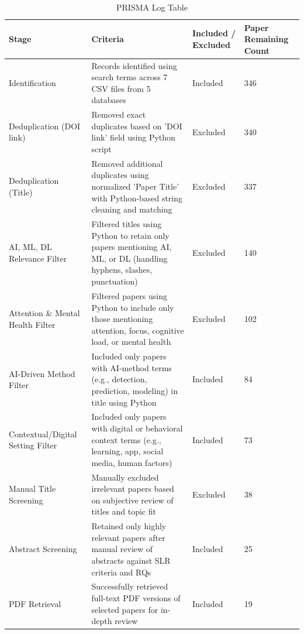 \documentclass[twocolumn,12pt]{article}
\begin{document}
\begin{table}[H]
\centering
\hspace{2cm}
\caption{PRISMA Log Table}
\begin{tabular}{|p{}|p{}|p{}|p{}|}
\hline
\textbf{Stage} & \textbf{Criteria} & \textbf{Included / Excluded} & \textbf{Paper Remaining Count} \\
\hline
Identification & Records identified using search terms across 7 CSV files from 5 databases & Included & 346 \\
\hline
Deduplication (DOI link) & Removed exact duplicates based on 'DOI link' field using Python script & Excluded & 340 \\
\hline
Deduplication (Title) & Removed additional duplicates using normalized 'Paper Title' with Python-based string cleaning and matching & Excluded & 337 \\
\hline
AI, ML, DL Relevance Filter & Filtered titles using Python to retain only papers mentioning AI, ML, or DL (handling hyphens, slashes, punctuation) & Excluded & 140 \\
\hline
Attention \& Mental Health Filter & Filtered papers using Python to include only those mentioning attention, focus, cognitive load, or mental health & Excluded & 102 \\
\hline
AI-Driven Method Filter & Included only papers with AI-method terms (e.g., detection, prediction, modeling) in title using Python & Included & 84 \\
\hline
Contextual/Digital Setting Filter & Included only papers with digital or behavioral context terms (e.g., learning, app, social media, human factors) & Included & 73 \\
\hline
Manual Title Screening & Manually excluded irrelevant papers based on subjective review of titles and topic fit & Excluded & 38 \\
\hline
Abstract Screening & Retained only highly relevant papers after manual review of abstracts against SLR criteria and RQs & Included & 25 \\
\hline
PDF Retrieval & Successfully retrieved full-text PDF versions of selected papers for in-depth review & Included & 19 \\
\hline
\end{tabular}
\end{table}



\onecolumn
\vspace{1em}
\end{document}
